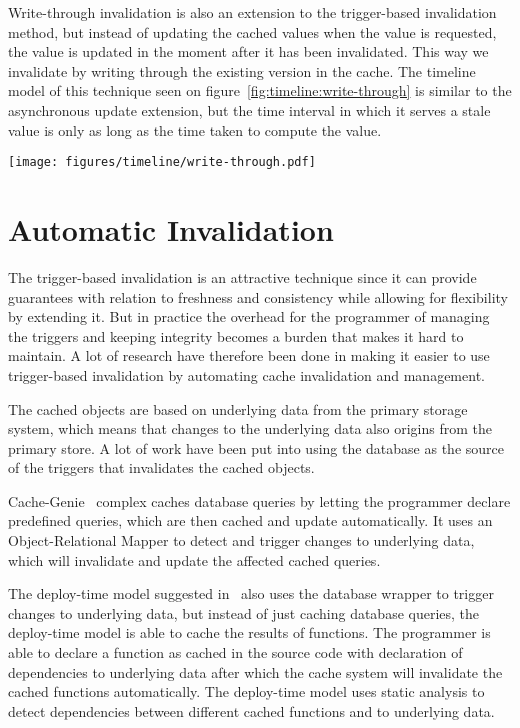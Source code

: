 Write-through invalidation is also an extension to the trigger-based invalidation method, but instead of updating the cached values when the value is requested, the value is updated in the moment after it has been invalidated. This way we invalidate by writing through the existing version in the cache. The timeline model of this technique seen on figure~\ref{fig:timeline:write-through} is similar to the asynchronous update extension, but the time interval in which it serves a stale value is only as long as the time taken to compute the value.

\begin{figure*}[ht!]
  \centering
  \texttt{[image: figures/timeline/write-through.pdf]}
  \caption{The lifecycle of the \emph{write-through invalidation} technique}
  \label{fig:timeline:write-through}
\end{figure*}


\section{Automatic Invalidation}
\label{subsec:automatic_invalidation}

The trigger-based invalidation is an attractive technique since it can provide guarantees with relation to freshness and consistency while allowing for flexibility by extending it. But in practice the overhead for the programmer of managing the triggers and keeping integrity becomes a burden that makes it hard to maintain. A lot of research have therefore been done in making it easier to use trigger-based invalidation by automating cache invalidation and management.

The cached objects are based on underlying data from the primary storage system, which means that changes to the underlying data also origins from the primary store. A lot of work have been put into using the database as the source of the triggers that invalidates the cached objects.

Cache-Genie~\cite{paper:cache-genie} complex caches database queries by letting the programmer declare predefined queries, which are then cached and update automatically. It uses an Object-Relational Mapper to detect and trigger changes to underlying data, which will invalidate and update the affected cached queries.

The deploy-time model suggested in~\cite{paper:deploy-time} also uses the database wrapper to trigger changes to underlying data, but instead of just caching database queries, the deploy-time model is able to cache the results of functions. The programmer is able to declare a function as cached in the source code with declaration of dependencies to underlying data after which the cache system will invalidate the cached functions automatically. The deploy-time model uses static analysis to detect dependencies between different cached functions and to underlying data.


